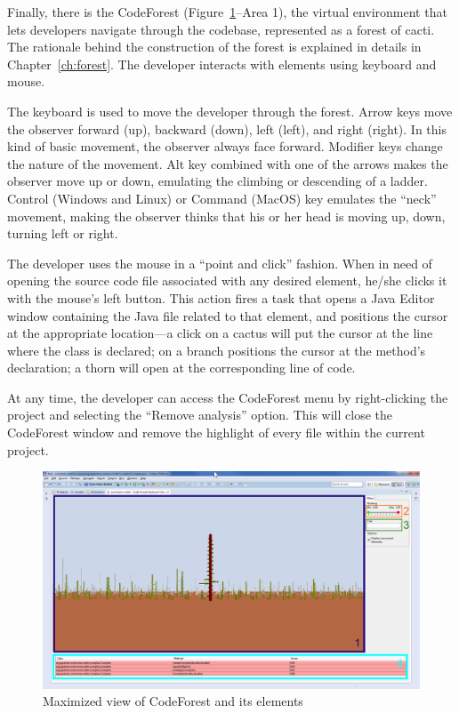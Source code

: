 Finally, there is the CodeForest (Figure~\ref{fig:operation-05}--Area 1), the
virtual environment that lets developers navigate through the codebase,
represented as a forest of cacti. The rationale behind the construction of the
forest is explained in details in Chapter~\ref{ch:forest}. The developer
interacts with elements using keyboard and mouse.

The keyboard is used to move the developer through the forest. Arrow keys move
the observer forward (up), backward (down), left (left), and right (right). In
this kind of basic movement, the observer always face forward. Modifier keys
change the nature of the movement. Alt key combined with one of the arrows makes
the observer move up or down, emulating the climbing or descending of a ladder.
Control (Windows and Linux) or Command (MacOS) key emulates the ``neck''
movement, making the observer thinks that his or her head is moving up, down,
turning left or right.

The developer uses the mouse in a ``point and click'' fashion. When in need of
opening the source code file associated with any desired element, he/she clicks
it with the mouse's left button. This action fires a task that opens a Java
Editor window containing the Java file related to that element, and positions
the cursor at the appropriate location---a click on a cactus will put the cursor
at the line where the class is declared; on a branch positions the cursor at the
method's declaration; a thorn will open at the corresponding line of code.

At any time, the developer can access the CodeForest menu by right-clicking the
project and selecting the ``Remove analysis'' option. This will close the
CodeForest window and remove the highlight of every file within the current
project.

\begin{figure}[h!]
\centerline{\includegraphics[width=\linewidth]{figures/commons_math_complex_04_view_max_numbers}}
\caption{Maximized view of CodeForest and its elements}\label{fig:operation-05}
\end{figure}

